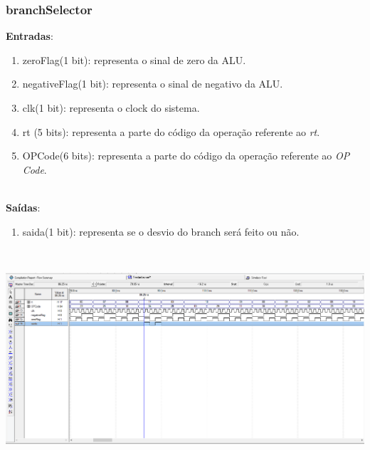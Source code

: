 \documentclass{article}
\begin{document}
    \subsubsection{branchSelector}
    \textbf{Entradas}:
   \begin{enumerate}
        \item zeroFlag(1 bit): representa o sinal de zero da ALU.
        \item negativeFlag(1 bit): representa o sinal de negativo da ALU.
        \item clk(1 bit): representa o clock do sistema.
        \item rt (5 bits): representa a parte do código da operação referente ao {\it rt}.
        \item OPCode(6 bits): representa a parte do código da operação referente ao {\it OP Code}.\\
    \end{enumerate}
    \\
    \textbf{Saídas}:
    \begin{enumerate}
        \item saida(1 bit): representa se o desvio do branch será feito ou não.\\
    \end{enumerate}\\
    \begin{center}
        \includegraphics[scale=0.4]{branchSelector.PNG}
    \end{center}
    \\
    \newpage
\end{document}
